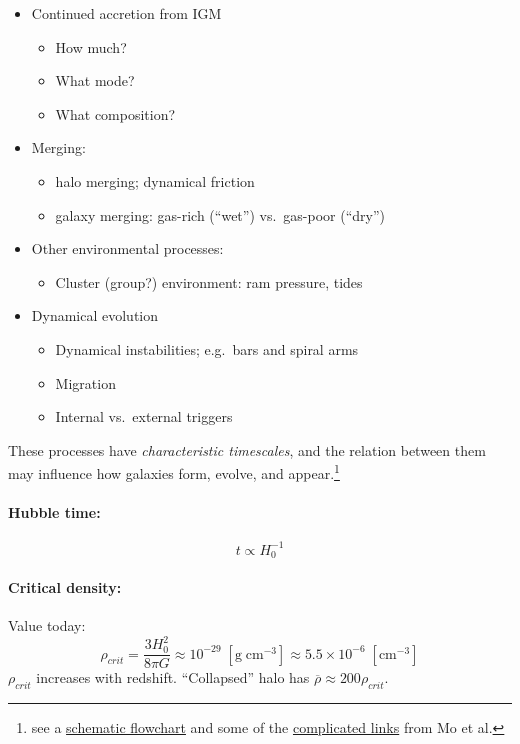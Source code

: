 \documentclass{article}
\begin{document}
\begin{itemize}
    \item Continued accretion from IGM
        \begin{itemize}
            \item How much?
            \item What mode?
            \item What composition?
        \end{itemize}
    \item Merging:
        \begin{itemize}
            \item halo merging; dynamical friction
            \item galaxy merging: gas-rich (``wet'') vs.\ gas-poor (``dry'')
        \end{itemize}
    \item Other environmental processes:
        \begin{itemize}
            \item Cluster (group?) environment: ram pressure, tides
        \end{itemize}
    \item Dynamical evolution
        \begin{itemize}
            \item Dynamical instabilities; e.g.\ bars and spiral arms
            \item Migration
            \item Internal vs.\ external triggers
        \end{itemize}
\end{itemize}
These processes have \emph{characteristic timescales}, and the relation between
them may influence how galaxies form, evolve, and appear.\footnote{
    see a \href{http://astronomy.nmsu.edu/holtz/a555/resources/mofig1.1.gif}
    {schematic flowchart} and some of the
    \href{http://astronomy.nmsu.edu/holtz/a555/resources/mofig1.1.gif}
    {complicated links} from Mo et al.}

\paragraph{Hubble time:}
\[
    t \propto H_{0}^{-1}
    \]
\paragraph{Critical density:}
Value today:
\[
    \rho_{crit} = \frac{3H_{0}^{2}}{8\pi{G}}
    \approx 10^{-29}\;[\mathrm{g\;cm}^{-3}]
    \approx 5.5\times10^{-6}\;[\mathrm{cm}^{-3}]
    \]
$\rho_{crit}$ increases with redshift. ``Collapsed'' halo has
$\overline{\rho} \approx 200\rho_{crit}$.
\end{document}
